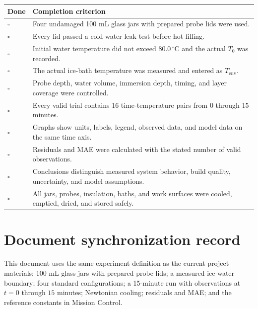 \documentclass[11pt,a4paper]{article}
\begin{document}
\begin{tabularx}{\textwidth}{C{12mm}Y}
\toprule
\textbf{Done} & \textbf{Completion criterion} \\
\midrule
$\square$ & Four undamaged 100 mL glass jars with prepared probe lids were used. \\
$\square$ & Every lid passed a cold-water leak test before hot filling. \\
$\square$ & Initial water temperature did not exceed $80.0\,^{\circ}\mathrm{C}$ and the actual $T_0$ was recorded. \\
$\square$ & The actual ice-bath temperature was measured and entered as $T_{\mathrm{env}}$. \\
$\square$ & Probe depth, water volume, immersion depth, timing, and layer coverage were controlled. \\
$\square$ & Every valid trial contains 16 time-temperature pairs from 0 through 15 minutes. \\
$\square$ & Graphs show units, labels, legend, observed data, and model data on the same time axis. \\
$\square$ & Residuals and MAE were calculated with the stated number of valid observations. \\
$\square$ & Conclusions distinguish measured system behavior, build quality, uncertainty, and model assumptions. \\
$\square$ & All jars, probes, insulation, baths, and work surfaces were cooled, emptied, dried, and stored safely. \\
\bottomrule
\end{tabularx}

\section{Document synchronization record}

This document uses the same experiment definition as the current project materials: 100 mL glass jars with prepared probe lids; a measured ice-water boundary; four standard configurations; a 15-minute run with observations at $t=0$ through $15$ minutes; Newtonian cooling; residuals and MAE; and the reference constants in Mission Control.
\end{document}
